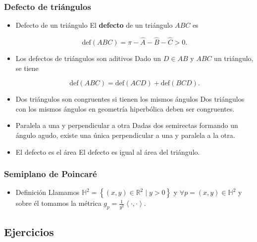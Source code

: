 \documentclass[11pt]{article}
\begin{document}
\subsubsection*{Defecto de triángulos}
\label{sec-5-2-4}
\begin{itemize}
\item Defecto de un triángulo
\label{sec-5-2-4-1}
El \textbf{defecto} de un triángulo $ABC$ es

\[ \mathrm{def}(ABC) =
\pi - {\widehat A} - \widehat B - \widehat C > 0.
\]

\item Los defectos de triángulos son aditivos
\label{sec-5-2-4-2}
Dado un $D \in AB$ y $ABC$ un triángulo, se tiene

\[ \mathrm{def}(ABC) = \mathrm{def}(ACD) + \mathrm{def}(BCD).
\]

\item Dos triángulos son congruentes si tienen los mismos ángulos
\label{sec-5-2-4-3}
Dos triángulos con los mismos ángulos en geometría hiperbólica
deben ser congruentes.

\item Paralela a una y perpendicular a otra
\label{sec-5-2-4-4}
Dadas dos semirectas formando un ángulo agudo, existe una única
perpendicular a una y paralela a la otra.

\item El defecto es el área
\label{sec-5-2-4-5}
El defecto es igual al área del triángulo.
\end{itemize}

\subsubsection*{Semiplano de Poincaré}
\label{sec-5-2-5}
\begin{itemize}
\item Definición
\label{sec-5-2-5-1}
Llamamos $\mathbb{H}^2 = \left\{ (x,y) \in \mathbb{R}^2\mid y>0
\right\}$ y $\forall p = (x,y) \in \mathbb{H}^2$ y sobre él tomamos 
la métrica $g_p = \frac{1}{y^{2}}\left\langle \cdot,\cdot \right\rangle$.
\end{itemize}

\subsection*{Ejercicios}
\label{sec-5-3}
\end{document}

